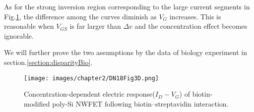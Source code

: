 As for the strong inversion region corresponding to the large current segments in Fig.\ref{fig:DN17Fig6d}, the difference among the curves diminish as $V_G$ increases.
This is reasonable when $V_{GS}$ is far larger than $\Delta v$ and the concentration effect becomes ignorable.

We will further prove the two assumptions by the data of biology experiment in section.\ref{section:disparityBio}.

\begin{figure}[!htbp]
    \centering
    \texttt{[image: images/chapter2/DN18Fig3D.png]}
    \caption{Concentration-dependent electric response($I_D-V_G$) of biotin-modified poly-Si NWFET following biotin–streptavidin interaction.\cite{DN17}}
    \label{fig:DN17Fig6d}
\end{figure}










%
